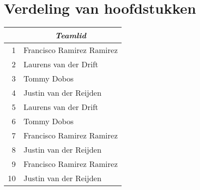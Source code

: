 \section{Verdeling van hoofdstukken}
\begin{table}[h]
\begin{tabular}{|r|l|}
\hline
\rowcolor[HTML]{9B9B9B} 
\multicolumn{1}{|c|}{\cellcolor[HTML]{9B9B9B}\textit{\textbf{Hoofdstuk}}} & \multicolumn{1}{c|}{\cellcolor[HTML]{9B9B9B}\textit{\textbf{Teamlid}}} \\ \hline
\rowcolor[HTML]{EFEFEF} 
1 & Francisco Ramirez Ramirez \\ \hline
2 & Laurens van der Drift \\ \hline
\rowcolor[HTML]{EFEFEF} 
3 & Tommy Dobos \\ \hline
4 & Justin van der Reijden \\ \hline
\rowcolor[HTML]{EFEFEF} 
5 & Laurens van der Drift \\ \hline
6 & Tommy Dobos \\ \hline
\rowcolor[HTML]{EFEFEF} 
7 & Francisco Ramirez Ramirez \\ \hline
8 & Justin van der Reijden \\ \hline
\rowcolor[HTML]{EFEFEF} 
9 & Francisco Ramirez Ramirez \\ \hline
10 & Justin van der Reijden \\ \hline
\end{tabular}
\end{table}